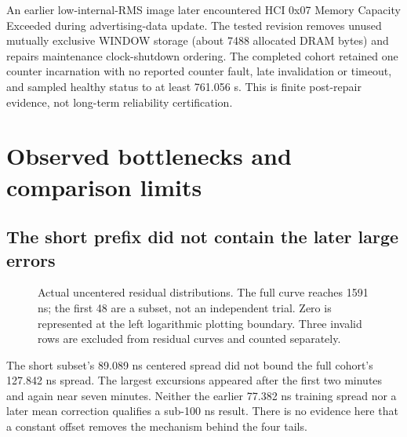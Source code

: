 \documentclass[10pt,letterpaper]{article}
\newcommand{\FineEcdf}{(1,0.0015220700) (1,0.0030441400) (2,0.0045662100) (2,0.0060882801) (3,0.0076103501) (3,0.0091324201) (4,0.0106544901) (4,0.0121765601) (4,0.0136986301) (4,0.0152207002) (5,0.0167427702) (5,0.0182648402) (6,0.0197869102) (7,0.0213089802) (7,0.0228310502) (7,0.0243531202) (8,0.0258751903) (8,0.0273972603) (8,0.0289193303) (8,0.0304414003) (9,0.0319634703) (10,0.0334855403) (10,0.0350076104) (10,0.0365296804) (10,0.0380517504) (11,0.0395738204) (11,0.0410958904) (12,0.0426179604) (12,0.0441400304) (12,0.0456621005) (12,0.0471841705) (13,0.0487062405) (13,0.0502283105) (13,0.0517503805) (13,0.0532724505) (14,0.0547945205) (14,0.0563165906) (15,0.0578386606) (15,0.0593607306) (17,0.0608828006) (17,0.0624048706) (18,0.0639269406) (18,0.0654490107) (18,0.0669710807) (18,0.0684931507) (19,0.0700152207) (19,0.0715372907) (19,0.0730593607) (19,0.0745814307) (19,0.0761035008) (19,0.0776255708) (19,0.0791476408) (20,0.0806697108) (20,0.0821917808) (20,0.0837138508) (20,0.0852359209) (20,0.0867579909) (21,0.0882800609) (21,0.0898021309) (22,0.0913242009) (22,0.0928462709) (22,0.0943683409) (22,0.0958904110) (23,0.0974124810) (23,0.0989345510) (23,0.1004566210) (23,0.1019786910) (23,0.1035007610) (23,0.1050228311) (24,0.1065449011) (24,0.1080669711) (25,0.1095890411) (25,0.1111111111) (25,0.1126331811) (26,0.1141552511) (26,0.1156773212) (27,0.1171993912) (27,0.1187214612) (28,0.1202435312) (28,0.1217656012) (29,0.1232876712) (29,0.1248097412) (29,0.1263318113) (29,0.1278538813) (29,0.1293759513) (29,0.1308980213) (29,0.1324200913) (30,0.1339421613) (31,0.1354642314) (31,0.1369863014) (32,0.1385083714) (32,0.1400304414) (32,0.1415525114) (32,0.1430745814) (33,0.1445966514) (33,0.1461187215) (33,0.1476407915) (33,0.1491628615) (33,0.1506849315) (33,0.1522070015) (34,0.1537290715) (35,0.1552511416) (35,0.1567732116) (35,0.1582952816) (36,0.1598173516) (36,0.1613394216) (36,0.1628614916) (36,0.1643835616) (36,0.1659056317) (37,0.1674277017) (37,0.1689497717) (37,0.1704718417) (37,0.1719939117) (37,0.1735159817) (38,0.1750380518) (38,0.1765601218) (38,0.1780821918) (39,0.1796042618) (39,0.1811263318) (39,0.1826484018) (40,0.1841704718) (40,0.1856925419) (40,0.1872146119) (40,0.1887366819) (41,0.1902587519) (41,0.1917808219) (41,0.1933028919) (41,0.1948249619) (41,0.1963470320) (42,0.1978691020) (42,0.1993911720) (42,0.2009132420) (43,0.2024353120) (44,0.2039573820) (45,0.2054794521) (45,0.2070015221) (46,0.2085235921) (46,0.2100456621) (46,0.2115677321) (47,0.2130898021) (47,0.2146118721) (48,0.2161339422) (48,0.2176560122) (48,0.2191780822) (48,0.2207001522) (48,0.2222222222) (49,0.2237442922) (49,0.2252663623) (50,0.2267884323) (51,0.2283105023) (52,0.2298325723) (53,0.2313546423) (53,0.2328767123) (53,0.2343987823) (53,0.2359208524) (53,0.2374429224) (54,0.2389649924) (54,0.2404870624) (54,0.2420091324) (54,0.2435312024) (54,0.2450532725) (54,0.2465753425) (55,0.2480974125) (55,0.2496194825) (55,0.2511415525) (55,0.2526636225) (56,0.2541856925) (56,0.2557077626) (56,0.2572298326) (56,0.2587519026) (57,0.2602739726) (58,0.2617960426) (58,0.2633181126) (58,0.2648401826) (58,0.2663622527) (58,0.2678843227) (58,0.2694063927) (58,0.2709284627) (59,0.2724505327) (59,0.2739726027) (59,0.2754946728) (59,0.2770167428) (59,0.2785388128) (61,0.2800608828) (61,0.2815829528) (61,0.2831050228) (62,0.2846270928) (62,0.2861491629) (62,0.2876712329) (62,0.2891933029) (62,0.2907153729) (63,0.2922374429) (63,0.2937595129) (65,0.2952815830) (65,0.2968036530) (65,0.2983257230) (65,0.2998477930) (65,0.3013698630) (66,0.3028919330) (66,0.3044140030) (66,0.3059360731) (66,0.3074581431) (66,0.3089802131) (66,0.3105022831) (67,0.3120243531) (67,0.3135464231) (67,0.3150684932) (67,0.3165905632) (68,0.3181126332) (68,0.3196347032) (69,0.3211567732) (69,0.3226788432) (70,0.3242009132) (70,0.3257229833) (70,0.3272450533) (71,0.3287671233) (71,0.3302891933) (71,0.3318112633) (72,0.3333333333) (72,0.3348554033) (72,0.3363774734) (73,0.3378995434) (73,0.3394216134) (74,0.3409436834) (74,0.3424657534) (74,0.3439878234) (74,0.3455098935) (75,0.3470319635) (75,0.3485540335) (75,0.3500761035) (75,0.3515981735) (75,0.3531202435) (76,0.3546423135) (76,0.3561643836) (76,0.3576864536) (76,0.3592085236) (76,0.3607305936) (77,0.3622526636) (77,0.3637747336) (77,0.3652968037) (78,0.3668188737) (78,0.3683409437) (79,0.3698630137) (79,0.3713850837) (79,0.3729071537) (79,0.3744292237) (79,0.3759512938) (80,0.3774733638) (80,0.3789954338) (80,0.3805175038) (81,0.3820395738) (81,0.3835616438) (81,0.3850837139) (81,0.3866057839) (82,0.3881278539) (82,0.3896499239) (83,0.3911719939) (83,0.3926940639) (83,0.3942161339) (83,0.3957382040) (84,0.3972602740) (84,0.3987823440) (84,0.4003044140) (84,0.4018264840) (84,0.4033485540) (84,0.4048706240) (85,0.4063926941) (85,0.4079147641) (86,0.4094368341) (86,0.4109589041) (87,0.4124809741) (87,0.4140030441) (87,0.4155251142) (87,0.4170471842) (87,0.4185692542) (88,0.4200913242) (88,0.4216133942) (88,0.4231354642) (88,0.4246575342) (88,0.4261796043) (88,0.4277016743) (89,0.4292237443) (89,0.4307458143) (89,0.4322678843) (89,0.4337899543) (89,0.4353120244) (89,0.4368340944) (90,0.4383561644) (90,0.4398782344) (90,0.4414003044) (90,0.4429223744) (90,0.4444444444) (90,0.4459665145) (91,0.4474885845) (92,0.4490106545) (92,0.4505327245) (92,0.4520547945) (92,0.4535768645) (92,0.4550989346) (94,0.4566210046) (94,0.4581430746) (94,0.4596651446) (94,0.4611872146) (94,0.4627092846) (95,0.4642313546) (95,0.4657534247) (95,0.4672754947) (95,0.4687975647) (96,0.4703196347) (96,0.4718417047) (96,0.4733637747) (96,0.4748858447) (97,0.4764079148) (97,0.4779299848) (97,0.4794520548) (97,0.4809741248) (97,0.4824961948) (97,0.4840182648) (97,0.4855403349) (98,0.4870624049) (98,0.4885844749) (98,0.4901065449) (98,0.4916286149) (98,0.4931506849) (98,0.4946727549) (99,0.4961948250) (100,0.4977168950) (100,0.4992389650) (100,0.5007610350) (101,0.5022831050) (101,0.5038051750) (101,0.5053272451) (102,0.5068493151) (102,0.5083713851) (103,0.5098934551) (103,0.5114155251) (103,0.5129375951) (104,0.5144596651) (104,0.5159817352) (104,0.5175038052) (104,0.5190258752) (104,0.5205479452) (105,0.5220700152) (106,0.5235920852) (106,0.5251141553) (106,0.5266362253) (106,0.5281582953) (107,0.5296803653) (107,0.5312024353) (107,0.5327245053) (107,0.5342465753) (107,0.5357686454) (108,0.5372907154) (108,0.5388127854) (108,0.5403348554) (108,0.5418569254) (108,0.5433789954) (109,0.5449010654) (109,0.5464231355) (109,0.5479452055) (109,0.5494672755) (109,0.5509893455) (110,0.5525114155) (110,0.5540334855) (110,0.5555555556) (110,0.5570776256) (110,0.5585996956) (111,0.5601217656) (111,0.5616438356) (111,0.5631659056) (111,0.5646879756) (112,0.5662100457) (112,0.5677321157) (112,0.5692541857) (113,0.5707762557) (113,0.5722983257) (114,0.5738203957) (114,0.5753424658) (114,0.5768645358) (115,0.5783866058) (115,0.5799086758) (116,0.5814307458) (118,0.5829528158) (118,0.5844748858) (118,0.5859969559) (119,0.5875190259) (119,0.5890410959) (121,0.5905631659) (121,0.5920852359) (121,0.5936073059) (122,0.5951293760) (122,0.5966514460) (122,0.5981735160) (122,0.5996955860) (122,0.6012176560) (123,0.6027397260) (123,0.6042617960) (123,0.6057838661) (123,0.6073059361) (124,0.6088280061) (124,0.6103500761) (125,0.6118721461) (126,0.6133942161) (126,0.6149162861) (127,0.6164383562) (127,0.6179604262) (128,0.6194824962) (128,0.6210045662) (128,0.6225266362) (128,0.6240487062) (129,0.6255707763) (129,0.6270928463) (129,0.6286149163) (130,0.6301369863) (130,0.6316590563) (130,0.6331811263) (131,0.6347031963) (131,0.6362252664) (132,0.6377473364) (132,0.6392694064) (133,0.6407914764) (133,0.6423135464) (133,0.6438356164) (134,0.6453576865) (134,0.6468797565) (134,0.6484018265) (135,0.6499238965) (135,0.6514459665) (136,0.6529680365) (136,0.6544901065) (136,0.6560121766) (136,0.6575342466) (137,0.6590563166) (137,0.6605783866) (138,0.6621004566) (138,0.6636225266) (138,0.6651445967) (139,0.6666666667) (139,0.6681887367) (140,0.6697108067) (140,0.6712328767) (140,0.6727549467) (140,0.6742770167) (140,0.6757990868) (142,0.6773211568) (142,0.6788432268) (142,0.6803652968) (142,0.6818873668) (142,0.6834094368) (143,0.6849315068) (143,0.6864535769) (143,0.6879756469) (143,0.6894977169) (144,0.6910197869) (144,0.6925418569) (145,0.6940639269) (145,0.6955859970) (147,0.6971080670) (147,0.6986301370) (147,0.7001522070) (147,0.7016742770) (148,0.7031963470) (148,0.7047184170) (149,0.7062404871) (149,0.7077625571) (150,0.7092846271) (150,0.7108066971) (150,0.7123287671) (150,0.7138508371) (150,0.7153729072) (151,0.7168949772) (151,0.7184170472) (152,0.7199391172) (153,0.7214611872) (153,0.7229832572) (154,0.7245053272) (154,0.7260273973) (155,0.7275494673) (157,0.7290715373) (157,0.7305936073) (157,0.7321156773) (157,0.7336377473) (158,0.7351598174) (158,0.7366818874) (158,0.7382039574) (159,0.7397260274) (159,0.7412480974) (159,0.7427701674) (160,0.7442922374) (160,0.7458143075) (160,0.7473363775) (160,0.7488584475) (161,0.7503805175) (161,0.7519025875) (161,0.7534246575) (161,0.7549467275) (161,0.7564687976) (161,0.7579908676) (162,0.7595129376) (163,0.7610350076) (163,0.7625570776) (163,0.7640791476) (164,0.7656012177) (165,0.7671232877) (165,0.7686453577) (166,0.7701674277) (166,0.7716894977) (166,0.7732115677) (168,0.7747336377) (168,0.7762557078) (168,0.7777777778) (168,0.7792998478) (169,0.7808219178) (169,0.7823439878) (169,0.7838660578) (170,0.7853881279) (170,0.7869101979) (171,0.7884322679) (171,0.7899543379) (171,0.7914764079) (172,0.7929984779) (173,0.7945205479) (173,0.7960426180) (174,0.7975646880) (175,0.7990867580) (175,0.8006088280) (175,0.8021308980) (175,0.8036529680) (176,0.8051750381) (176,0.8066971081) (177,0.8082191781) (177,0.8097412481) (178,0.8112633181) (179,0.8127853881) (179,0.8143074581) (179,0.8158295282) (179,0.8173515982) (179,0.8188736682) (180,0.8203957382) (180,0.8219178082) (181,0.8234398782) (181,0.8249619482) (181,0.8264840183) (182,0.8280060883) (183,0.8295281583) (184,0.8310502283) (184,0.8325722983) (184,0.8340943683) (186,0.8356164384) (186,0.8371385084) (186,0.8386605784) (186,0.8401826484) (186,0.8417047184) (186,0.8432267884) (187,0.8447488584) (187,0.8462709285) (188,0.8477929985) (189,0.8493150685) (190,0.8508371385) (190,0.8523592085) (190,0.8538812785) (192,0.8554033486) (192,0.8569254186) (192,0.8584474886) (192,0.8599695586) (193,0.8614916286) (195,0.8630136986) (195,0.8645357686) (195,0.8660578387) (195,0.8675799087) (196,0.8691019787) (197,0.8706240487) (197,0.8721461187) (197,0.8736681887) (197,0.8751902588) (198,0.8767123288) (198,0.8782343988) (198,0.8797564688) (198,0.8812785388) (199,0.8828006088) (199,0.8843226788) (199,0.8858447489) (200,0.8873668189) (200,0.8888888889) (202,0.8904109589) (202,0.8919330289) (202,0.8934550989) (204,0.8949771689) (206,0.8964992390) (206,0.8980213090) (207,0.8995433790) (208,0.9010654490) (211,0.9025875190) (212,0.9041095890) (212,0.9056316591) (212,0.9071537291) (213,0.9086757991) (213,0.9101978691) (213,0.9117199391) (214,0.9132420091) (214,0.9147640791) (215,0.9162861492) (215,0.9178082192) (218,0.9193302892) (220,0.9208523592) (222,0.9223744292) (222,0.9238964992) (222,0.9254185693) (223,0.9269406393) (224,0.9284627093) (224,0.9299847793) (224,0.9315068493) (225,0.9330289193) (225,0.9345509893) (226,0.9360730594) (228,0.9375951294) (229,0.9391171994) (232,0.9406392694) (233,0.9421613394) (235,0.9436834094) (235,0.9452054795) (237,0.9467275495) (239,0.9482496195) (239,0.9497716895) (239,0.9512937595) (242,0.9528158295) (243,0.9543378995) (244,0.9558599696) (246,0.9573820396) (250,0.9589041096) (251,0.9604261796) (256,0.9619482496) (256,0.9634703196) (256,0.9649923896) (257,0.9665144597) (259,0.9680365297) (261,0.9695585997) (263,0.9710806697) (264,0.9726027397) (266,0.9741248097) (269,0.9756468798) (271,0.9771689498) (273,0.9786910198) (275,0.9802130898) (279,0.9817351598) (283,0.9832572298) (283,0.9847792998) (284,0.9863013699) (289,0.9878234399) (299,0.9893455099) (310,0.9908675799) (354,0.9923896499) (357,0.9939117199) (1174,0.9954337900) (1239,0.9969558600) (1312,0.9984779300) (1591,1.0000000000)}
\newcommand{\SubsetEcdf}{(10,0.0208333333) (19,0.0416666667) (22,0.0625000000) (24,0.0833333333) (29,0.1041666667) (32,0.1250000000) (40,0.1458333333) (40,0.1666666667) (41,0.1875000000) (48,0.2083333333) (74,0.2291666667) (75,0.2500000000) (89,0.2708333333) (92,0.2916666667) (94,0.3125000000) (98,0.3333333333) (106,0.3541666667) (106,0.3750000000) (114,0.3958333333) (138,0.4166666667) (140,0.4375000000) (144,0.4583333333) (158,0.4791666667) (166,0.5000000000) (168,0.5208333333) (174,0.5416666667) (180,0.5625000000) (186,0.5833333333) (187,0.6041666667) (187,0.6250000000) (192,0.6458333333) (193,0.6666666667) (198,0.6875000000) (200,0.7083333333) (202,0.7291666667) (204,0.7500000000) (218,0.7708333333) (224,0.7916666667) (225,0.8125000000) (235,0.8333333333) (239,0.8541666667) (239,0.8750000000) (242,0.8958333333) (257,0.9166666667) (259,0.9375000000) (263,0.9583333333) (275,0.9791666667) (284,1.0000000000)}
\begin{document}
An earlier low-internal-RMS image later encountered HCI 0x07 Memory Capacity Exceeded during advertising-data update. The tested revision removes unused mutually exclusive WINDOW storage (about 7488 allocated DRAM bytes) and repairs maintenance clock-shutdown ordering. The completed cohort retained one counter incarnation with no reported counter fault, late invalidation or timeout, and sampled healthy status to at least 761.056 s. This is finite post-repair evidence, not long-term reliability certification.
\newpage

\section{Observed bottlenecks and comparison limits}\label{sec:bottlenecks}
\subsection{The short prefix did not contain the later large errors}
\begin{figure}[ht]\centering{}
\caption{Actual uncentered residual distributions. The full curve reaches 1591 ns; the first 48 are a subset, not an independent trial. Zero is represented at the left logarithmic plotting boundary. Three invalid rows are excluded from residual curves and counted separately.}
\end{figure}

The short subset's 89.089 ns centered spread did not bound the full cohort's 127.842 ns spread. The largest excursions appeared after the first two minutes and again near seven minutes. Neither the earlier 77.382 ns training spread nor a later mean correction qualifies a sub-100 ns result. There is no evidence here that a constant offset removes the mechanism behind the four tails.
\end{document}
